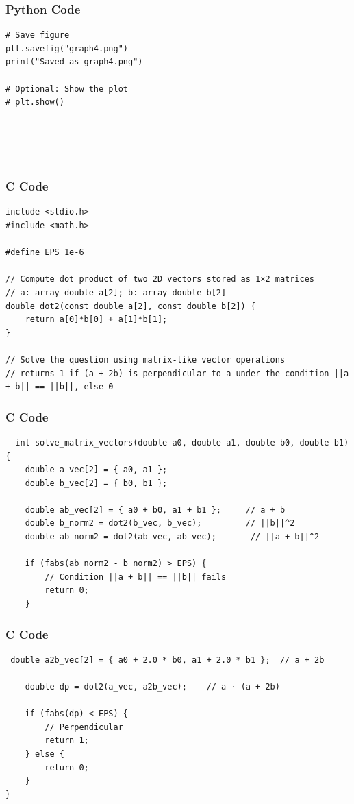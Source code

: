 \documentclass{beamer}
\begin{document}
\begin{frame}[fragile]
    \frametitle{Python Code}

    \begin{lstlisting}
# Save figure
plt.savefig("graph4.png")
print("Saved as graph4.png")

# Optional: Show the plot
# plt.show()





  \end{lstlisting}
\end{frame}

\begin{frame}[fragile]
\frametitle{C Code}
\begin{lstlisting}
include <stdio.h>
#include <math.h>

#define EPS 1e-6

// Compute dot product of two 2D vectors stored as 1×2 matrices
// a: array double a[2]; b: array double b[2]
double dot2(const double a[2], const double b[2]) {
    return a[0]*b[0] + a[1]*b[1];
}

// Solve the question using matrix-like vector operations
// returns 1 if (a + 2b) is perpendicular to a under the condition ||a + b|| == ||b||, else 0

    \end{lstlisting}

\end{frame}

\begin{frame}[fragile]
\frametitle{C Code}
\begin{lstlisting}
  int solve_matrix_vectors(double a0, double a1, double b0, double b1) {
    double a_vec[2] = { a0, a1 };
    double b_vec[2] = { b0, b1 };

    double ab_vec[2] = { a0 + b0, a1 + b1 };     // a + b
    double b_norm2 = dot2(b_vec, b_vec);         // ||b||^2
    double ab_norm2 = dot2(ab_vec, ab_vec);       // ||a + b||^2

    if (fabs(ab_norm2 - b_norm2) > EPS) {
        // Condition ||a + b|| == ||b|| fails
        return 0;
    }
\end{lstlisting}
\end{frame}
\begin{frame}[fragile]
\frametitle{C Code}
\begin{lstlisting}
 double a2b_vec[2] = { a0 + 2.0 * b0, a1 + 2.0 * b1 };  // a + 2b

    double dp = dot2(a_vec, a2b_vec);    // a · (a + 2b)

    if (fabs(dp) < EPS) {
        // Perpendicular
        return 1;
    } else {
        return 0;
    }
}

\end{lstlisting}
\end{frame}
\end{document}
